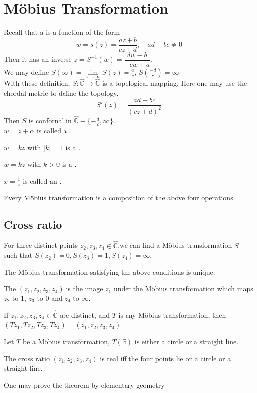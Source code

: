 \section{M{\"o}bius Transformation}
Recall that a  is a function of the form
\[w=s(z)=\frac{az+b}{cz+d},\quad ad-bc\not=0\]
Then it has an inverse  $ z=S^{-1}(w)=\dfrac{dw-b}{-cw+a} $.\\
We may define  $ S(\infty)=\lim\limits_{z\to \infty}S(z)=\frac{a }{c} $, $ S(\frac{-d }{c})=\infty $ \\
With these definition,  $ S:\hat{\mathbb{C}}\rightarrow\hat{\mathbb{C}} $ is a topological mapping. Here one may use the chordal metric to define the topology.\\
\[S'(z)=\frac{ad-bc}{(cz+d)^2}\]
Then  $ S  $ is confornal in  $ \hat{\mathbb{C}}-\{-\frac{d }{c},\infty\} $.\\
 $ w=z+\alpha  $ is called a .
 
 $ w=kz  $ with  $ |k|=1 $ is a .
 
  $ w=kz $ with  $ k>0  $ is a .
  
   $ x=\frac{1 }{z }  $ is called an .
\begin{proposition}
    Every M{\"o}bius transformation is a composition of the above four operations.
\end{proposition}    
\subsection{Cross ratio}
For three distinct points  $ z_2,z_3,z_4\in\hat{\mathbb{C}} $,we can find a M{\"o}bius transformation  $ S $ such that  $ S(z_2)=0,S(z_3)=1,S(z_4)=\infty $.
\begin{lemma}
    The M{\"o}bius transformation satisfying the above conditions is unique.
\end{lemma}
The  $ (z_1,z_2,z_3,z_4) $ is the image  $ z_1 $ under the M{\"o}bius transformation which maps  $ z_2  $ to 1, $ z_3  $ to 0 and $ z_4  $ to  $ \infty $.
\begin{theorem}
    If  $ z_1,z_2,z_3,z_4\in \hat{\mathbb{C}} $  are distinct, and  $ T  $ is any M{\"o}bius transformation, then $ (Tz_1,Tz_2,Tz_3,Tz_4)=(z_1,z_2,z_3,z_4) $. 
\end{theorem} 
\begin{lemma}
    Let  $ T  $ be a M{\"o}bius transformation,  $ T(\mathbb{R}) $ is either a circle or a straight line.
\end{lemma}  
\begin{theorem}
    The cross ratio  $ (z_1,z_2,z_3,z_4) $ is real iff the four points lie on a circle or a straight line.
\end{theorem}
\begin{remark}
    One may prove the theorem by elementary geometry
\end{remark}
